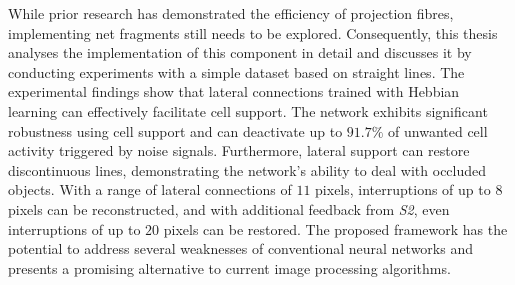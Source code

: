 While prior research has demonstrated the efficiency of projection fibres, implementing net fragments still needs to be explored.
Consequently, this thesis analyses the implementation of this component in detail and discusses it by conducting experiments with a simple dataset based on straight lines.
The experimental findings show that lateral connections trained with Hebbian learning can effectively facilitate cell support.
The network exhibits significant robustness using cell support and can deactivate up to $91.7\%$ of unwanted cell activity triggered by noise signals. Furthermore, lateral support can restore discontinuous lines, demonstrating the network's ability to deal with occluded objects. With a range of lateral connections of $11$ pixels, interruptions of up to $8$ pixels can be reconstructed, and with additional feedback from \emph{S2}, even interruptions of up to $20$ pixels can be restored. The proposed framework has the potential to address several weaknesses of conventional neural networks and presents a promising alternative to current image processing algorithms.